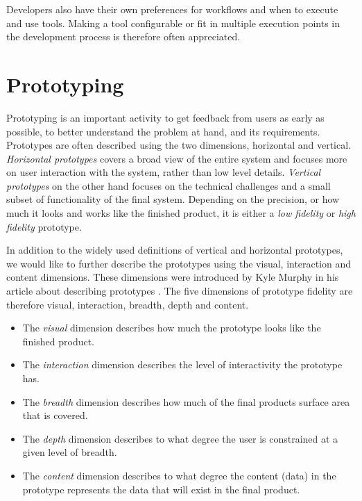 \documentclass[pdftex,10pt,b5paper,twoside]{report}
\begin{document}
Developers also have their own preferences for workflows and when to execute and use tools. Making a tool configurable or fit in multiple execution points in the development process is therefore often appreciated.

\section{Prototyping}
Prototyping is an important activity to get feedback from users as early as possible, to better understand the problem at hand, and its requirements. Prototypes are often described using the two dimensions, horizontal and vertical. \textit{Horizontal prototypes} covers a broad view of the entire system and focuses more on user interaction with the system, rather than low level details. \textit{Vertical prototypes} on the other hand focuses on the technical challenges and a small subset of functionality of the final system. Depending on the precision, or how much it looks and works like the finished product, it is either a \textit{low fidelity} or \textit{high fidelity} prototype. 

In addition to the widely used definitions of vertical and horizontal prototypes, we would like to further describe the prototypes using the visual, interaction and content dimensions. These dimensions were introduced by Kyle Murphy in his article about describing prototypes \cite{prototype-dimensions}. The five dimensions of prototype fidelity are therefore visual, interaction, breadth, depth and content.

\begin{itemize}
    \item The \textit{visual} dimension describes how much the prototype looks like the finished product. 
    \item The \textit{interaction} dimension describes the level of interactivity the prototype has. 
    
    \item The \textit{breadth} dimension describes how much of the final products surface area that is covered. 
    
    \item The \textit{depth} dimension describes to what degree the user is constrained at a given level of breadth.
    
    \item The \textit{content} dimension describes to what degree the content (data) in the prototype represents the data that will exist in the final product.     
\end{itemize}
\end{document}
